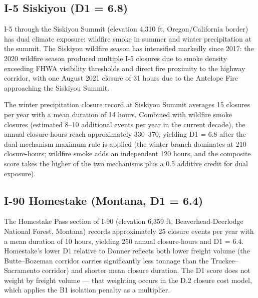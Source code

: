 \subsection{I-5 Siskiyou (D1 = 6.8)}

I-5 through the Siskiyou Summit (elevation 4,310 ft, Oregon/California border) has dual
climate exposure: wildfire smoke in summer and winter precipitation at the summit.
The Siskiyou wildfire season has intensified markedly since 2017: the 2020 wildfire
season produced multiple I-5 closures due to smoke density exceeding FHWA visibility
thresholds and direct fire proximity to the highway corridor, with one August 2021
closure of 31 hours due to the Antelope Fire approaching the Siskiyou Summit.

The winter precipitation closure record at Siskiyou Summit averages 15 closures per
year with a mean duration of 14 hours. Combined with wildfire smoke closures (estimated
8--10 additional events per year in the current decade), the annual closure-hours reach
approximately 330--370, yielding D1 = 6.8 after the dual-mechanism maximum rule is
applied (the winter branch dominates at 210 closure-hours; wildfire smoke adds an
independent 120 hours, and the composite score takes the higher of the two
mechanisms plus a 0.5 additive credit for dual exposure).

\subsection{I-90 Homestake (Montana, D1 = 6.4)}

The Homestake Pass section of I-90 (elevation 6,359 ft, Beaverhead-Deerlodge National
Forest, Montana) records approximately 25 closure events per year with a mean duration
of 10 hours, yielding 250 annual closure-hours and D1 = 6.4. Homestake's lower D1
relative to Donner reflects both lower freight volume (the Butte--Bozeman corridor carries
significantly less tonnage than the Truckee--Sacramento corridor) and shorter mean closure
duration. The D1 score does not weight by freight volume --- that weighting occurs in the
D.2 closure cost model, which applies the B1 isolation penalty as a multiplier.
